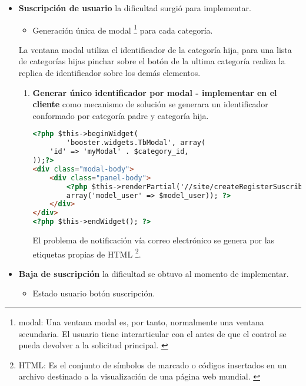 \begin{itemize}

\item \textbf{Suscripción de usuario} la dificultad surgió para implementar.

\begin{itemize}

\item Generación única de modal \footnote{modal: Una ventana modal es,
por tanto, normalmente una ventana secundaria. El usuario tiene interarticular
con el antes de que el control se pueda devolver a la solicitud principal.
\cite{modal}} para cada categoría.

\end{itemize}

La ventana modal utiliza el identificador de la categoría hija, para una lista
de categorías hijas pinchar sobre el botón de la ultima categoría realiza la
replica de identificador sobre los demás elementos.

\begin{enumerate}

\item \textbf{Generar único identificador por modal - implementar en el cliente}
como mecanismo de solución se generara un identificador conformado por
categoría padre y categoría hija.

\begin{lstlisting}[language=HTML, caption={Generador ventana modal.}]
<?php $this->beginWidget(
        'booster.widgets.TbModal', array(
    'id' => 'myModal' . $category_id,
));?>
<div class="modal-body">
    <div class="panel-body">
        <?php $this->renderPartial('//site/createRegisterSuscribe', 
        array('model_user' => $model_user)); ?>
    </div>
</div>
<?php $this->endWidget(); ?>
\end{lstlisting}

El problema de notificación vía correo electrónico se genera por las etiquetas
propias de HTML \footnote{HTML: Es el conjunto de símbolos de marcado o
códigos insertados en un archivo destinado a la visualización de una página
web mundial. \cite{html}}.

\end{enumerate}

\item \textbf{Baja de suscripción} la dificultad se obtuvo al momento de implementar.

\begin{itemize}

\item Estado usuario botón suscripción.


\end{itemize}
\end{itemize}
